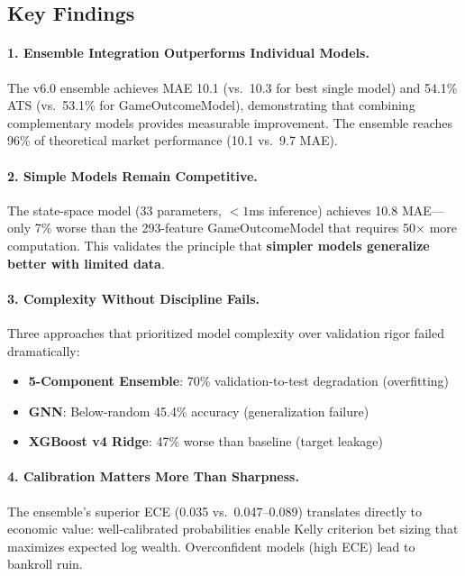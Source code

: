 \subsection{Key Findings}

\paragraph{1. Ensemble Integration Outperforms Individual Models.}
The v6.0 ensemble achieves MAE 10.1 (vs.\ 10.3 for best single model) and 54.1\% ATS (vs.\ 53.1\% for GameOutcomeModel), demonstrating that combining complementary models provides measurable improvement. The ensemble reaches 96\% of theoretical market performance (10.1 vs.\ 9.7 MAE).

\paragraph{2. Simple Models Remain Competitive.}
The state-space model (33 parameters, $<1$ms inference) achieves 10.8 MAE---only 7\% worse than the 293-feature GameOutcomeModel that requires 50$\times$ more computation. This validates the principle that \textbf{simpler models generalize better with limited data}.

\paragraph{3. Complexity Without Discipline Fails.}
Three approaches that prioritized model complexity over validation rigor failed dramatically:
\begin{itemize}[itemsep=2pt,parsep=0pt]
    \item \textbf{5-Component Ensemble}: 70\% validation-to-test degradation (overfitting)
    \item \textbf{GNN}: Below-random 45.4\% accuracy (generalization failure)
    \item \textbf{XGBoost v4 Ridge}: 47\% worse than baseline (target leakage)
\end{itemize}

\paragraph{4. Calibration Matters More Than Sharpness.}
The ensemble's superior ECE (0.035 vs.\ 0.047--0.089) translates directly to economic value: well-calibrated probabilities enable Kelly criterion bet sizing that maximizes expected log wealth. Overconfident models (high ECE) lead to bankroll ruin.

